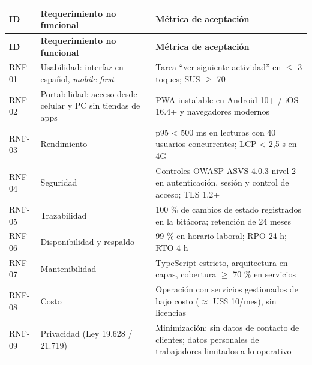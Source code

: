 \documentclass[11pt,a4paper]{article}
\begin{document}
\begingroup
\begin{longtable}{@{}>{\raggedright\arraybackslash\hspace{0pt}}p{}>{\raggedright\arraybackslash\hspace{0pt}}p{}>{\raggedright\arraybackslash\hspace{0pt}}p{}@{}}
\toprule
\textbf{ID} & \textbf{Requerimiento no funcional} & \textbf{Métrica de aceptación} \\ \midrule
\endfirsthead
\toprule
\textbf{ID} & \textbf{Requerimiento no funcional} & \textbf{Métrica de aceptación} \\ \midrule
\endhead
\bottomrule
\endlastfoot
\mbox{RNF-01} & Usabilidad: interfaz en español, \textit{mobile-first} & Tarea ``ver siguiente actividad'' en \ensuremath{\leq} 3 toques; SUS \ensuremath{\geq} 70 \\ \addlinespace[0.25em]
\mbox{RNF-02} & Portabilidad: acceso desde celular y PC sin tiendas de apps & PWA instalable en Android 10+ / iOS 16.4+ y navegadores modernos \\ \addlinespace[0.25em]
\mbox{RNF-03} & \mbox{Rendimiento} & p95 < 500 ms en lecturas con 40 usuarios concurrentes; LCP < 2,5 s en 4G \\ \addlinespace[0.25em]
\mbox{RNF-04} & \mbox{Seguridad} & Controles OWASP ASVS 4.0.3 nivel 2 en autenticación, sesión y control de acceso; TLS 1.2+ \\ \addlinespace[0.25em]
\mbox{RNF-05} & \mbox{Trazabilidad} & 100 \% de cambios de estado registrados en la bitácora; retención de 24 meses \\ \addlinespace[0.25em]
\mbox{RNF-06} & Disponibilidad y respaldo & 99 \% en horario laboral; RPO 24 h; RTO 4 h \\ \addlinespace[0.25em]
\mbox{RNF-07} & Mantenibilidad & TypeScript estricto, arquitectura en capas, cobertura \ensuremath{\geq} 70 \% en servicios \\ \addlinespace[0.25em]
\mbox{RNF-08} & \mbox{Costo} & Operación con servicios gestionados de bajo costo (\ensuremath{\approx} US\$ 10/mes), sin licencias \\ \addlinespace[0.25em]
\mbox{RNF-09} & Privacidad (Ley 19.628 / 21.719) & Minimización: sin datos de contacto de clientes; datos personales de trabajadores limitados a lo operativo \\
\end{longtable}
\endgroup
\end{document}
